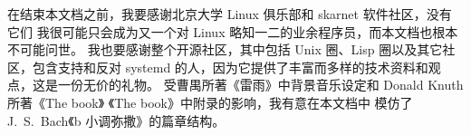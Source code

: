 \documentclass[UTF8]{ctexart}
\begin{document}
在结束本文档之前，我要感谢北京大学 Linux 俱乐部和 skarnet 软件社区，没有它们
我很可能只会成为又一个对 Linux 略知一二的业余程序员，而本文档也根本不可能问世。
我也要感谢整个开源社区，其中包括 Unix 圈、Lisp 圈以及其它社区，包含支持和反对
systemd 的人，因为它提供了丰富而多样的技术资料和观点，这是一份无价的礼物。
受曹禺所著《雷雨》中背景音乐设定和 Donald Knuth 所著《The book》%
《The book》中附录的影响，我有意在本文档中
模仿了 J.~S.\ Bach《b 小调弥撒》的篇章结构。
\end{document}

